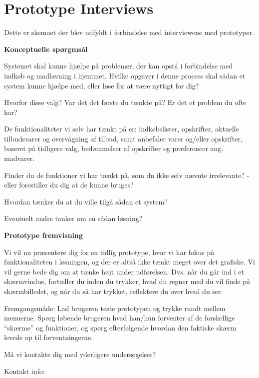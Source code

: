 \chapter{Prototype Interviews}\label{ch:PrototypeInterview}
Dette er skemaet der blev udfyldt i forbindelse med interviewene med prototyper.

\textbf{Konceptuelle spørgmsål}

Systemet skal kunne hjælpe på problemer, der kan opstå i forbindelse med indkøb og madlavning i hjemmet.
Hvilke opgaver i denne process skal sådan et system kunne hjælpe med, eller løse for at være nyttigt for dig?

Hvorfor disse valg? Var det det første du tænkte på? Er det et problem du ofte har?

De funktionaliteter vi selv har tænkt på er: indkøbslister, opskrifter, aktuelle tilbudsvarer og overvågning af tilbud, samt anbefaler varer og/eller opskrifter, baseret på tidligere valg, bedømmelser af opskrifter og præferencer ang. madvarer.

Finder du de funktioner vi har tænkt på, som du ikke selv nævnte irrelevante? - eller forestiller du dig at de kunne bruges?

Hvordan tænker du at du ville tilgå sådan et system?

Eventuelt andre tanker om en sådan løsning?

\textbf{Prototype fremvisning}

Vi vil nu præsentere dig for en tidlig prototype, hvor vi har fokus på funktionaliteten i løsningen, og der er altså ikke tænkt meget over det grafiske.
Vi vil gerne bede dig om at tænke højt under udførelsen. Dvs. når du går ind i et skærmvindue, fortæller du inden du trykker, hvad du regner med du vil finde på skærmbilledet, og når du så har trykket, reflektere du over hvad du ser.

Fremgangsmåde: Lad brugeren teste prototypen og trykke rundt mellem menuerne. Spørg løbende brugeren hvad han/hun forventer af de forskellige “skærme” og funktioner, og spørg efterfølgende hvordan den faktiske skærm levede op til forventningerne.  

Må vi kontakte dig med yderligere undersøgelser?

Kontakt info:

